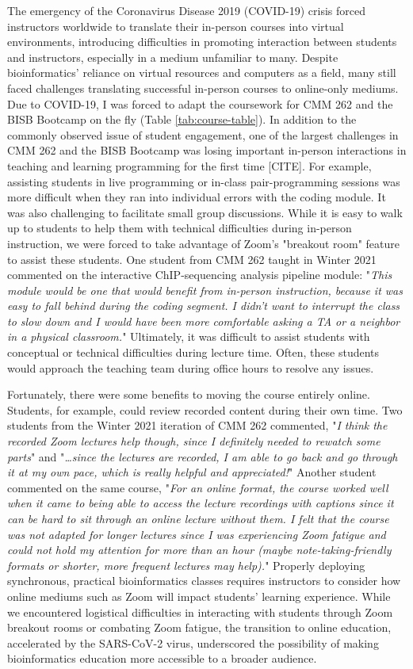 The emergency of the Coronavirus Disease 2019 (COVID-19) crisis forced instructors worldwide to translate their in-person courses into virtual environments, introducing difficulties in promoting interaction between students and instructors, especially in a medium unfamiliar to many. Despite bioinformatics’ reliance on virtual resources and computers as a field, many still faced challenges translating successful in-person courses to online-only mediums. Due to COVID-19, I was forced to adapt the coursework for CMM 262 and the BISB Bootcamp on the fly (Table \ref{tab:course-table}). In addition to the commonly observed issue of student engagement, one of the largest challenges in CMM 262 and the BISB Bootcamp was losing important in-person interactions in teaching and learning programming for the first time [CITE]. For example, assisting students in live programming or in-class pair-programming sessions was more difficult when they ran into individual errors with the coding module. It was also challenging to facilitate small group discussions. While it is easy to walk up to students to help them with technical difficulties during in-person instruction, we were forced to take advantage of Zoom's "breakout room" feature to assist these students. One student from CMM 262 taught in Winter 2021 commented on the interactive ChIP-sequencing analysis pipeline module: "\textit{This module would be one that would benefit from in-person instruction, because it was easy to fall behind during the coding segment. I didn't want to interrupt the class to slow down and I would have been more comfortable asking a TA or a neighbor in a physical classroom.}" Ultimately, it was difficult to assist students with conceptual or technical difficulties during lecture time. Often, these students would approach the teaching team during office hours to resolve any issues. 

Fortunately, there were some benefits to moving the course entirely online. Students, for example, could review recorded content during their own time. Two students from the Winter 2021 iteration of CMM 262 commented, "\textit{I think the recorded Zoom lectures help though, since I definitely needed to rewatch some parts}" and "\textit{…since the lectures are recorded, I am able to go back and go through it at my own pace, which is really helpful and appreciated!}" Another student commented on the same course, "\textit{For an online format, the course worked well when it came to being able to access the lecture recordings with captions since it can be hard to sit through an online lecture without them. I felt that the course was not adapted for longer lectures since I was experiencing Zoom fatigue and could not hold my attention for more than an hour (maybe note-taking-friendly formats or shorter, more frequent lectures may help).}" Properly deploying synchronous, practical bioinformatics classes requires instructors to consider how online mediums such as Zoom will impact students' learning experience. While we encountered logistical difficulties in interacting with students through Zoom breakout rooms or combating Zoom fatigue, the transition to online education, accelerated by the SARS-CoV-2 virus, underscored the possibility of making bioinformatics education more accessible to a broader audience. 

